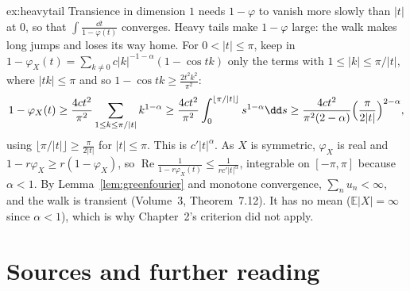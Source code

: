 \begin{solution}{ex:heavytail}
\idea Transience in dimension $1$ needs $1-\varphi$ to vanish more slowly than $|t|$ at $0$, so that $\int\frac{\dd t}{1-\varphi(t)}$ converges. Heavy tails make $1-\varphi$
large: the walk makes long jumps and loses its way home.
\writeup For $0<|t|\le\pi$, keep in $1-\varphi_X(t)=\sum_{k\ne0}c|k|^{-1-\alpha}(1-\cos tk)$ only the terms with $1\le|k|\le\pi/|t|$, where $|tk|\le\pi$ and so
$1-\cos tk\ge\frac{2t^2k^2}{\pi^2}$:
\[
1-\varphi_X(t)\ge\frac{4ct^2}{\pi^2}\sum_{1\le k\le\pi/|t|}k^{1-\alpha}\ge\frac{4ct^2}{\pi^2}\int_0^{\lfloor\pi/|t|\rfloor}s^{1-\alpha}\dd s
\ge\frac{4ct^2}{\pi^2(2-\alpha)}\Bigl(\frac\pi{2|t|}\Bigr)^{2-\alpha},
\]
using $\lfloor\pi/|t|\rfloor\ge\frac\pi{2|t|}$ for $|t|\le\pi$. This is $c'|t|^\alpha$. As $X$ is symmetric, $\varphi_X$ is real and $1-r\varphi_X\ge r(1-\varphi_X)$, so
$\operatorname{Re}\frac1{1-r\varphi_X(t)}\le\frac1{rc'|t|^\alpha}$, integrable on $[-\pi,\pi]$ because $\alpha<1$. By Lemma~\ref{lem:greenfourier} and monotone convergence,
$\sum_nu_n<\infty$, and the walk is transient (Volume~3, Theorem~7.12). It has no mean ($\mathbb E|X|=\infty$ since $\alpha<1$), which is why Chapter~2's
criterion did not apply.
\end{solution}

\section*{Sources and further reading}

